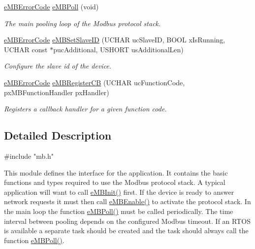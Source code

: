 \begin{DoxyCompactItemize}
\hyperlink{group__modbus_ga9e7fce8c431cb0e521c67f7f36dd823d}{e\+M\+B\+Error\+Code} \hyperlink{group__modbus_ga12648c98d45f768ba878fbcee46caca5}{e\+M\+B\+Poll} (void)
\begin{DoxyCompactList}\small\item\em The main pooling loop of the Modbus protocol stack. \end{DoxyCompactList}\item 
\hyperlink{group__modbus_ga9e7fce8c431cb0e521c67f7f36dd823d}{e\+M\+B\+Error\+Code} \hyperlink{group__modbus_gabe2b0e2dccf23d506666aa3cfdf6a8a3}{e\+M\+B\+Set\+Slave\+ID} (U\+C\+H\+AR uc\+Slave\+ID, B\+O\+OL x\+Is\+Running, U\+C\+H\+AR const $\ast$puc\+Additional, U\+S\+H\+O\+RT us\+Additional\+Len)
\begin{DoxyCompactList}\small\item\em Configure the slave id of the device. \end{DoxyCompactList}\item 
\hyperlink{group__modbus_ga9e7fce8c431cb0e521c67f7f36dd823d}{e\+M\+B\+Error\+Code} \hyperlink{group__modbus_ga5f6e66893b2388a602ac453253a00784}{e\+M\+B\+Register\+CB} (U\+C\+H\+AR uc\+Function\+Code, px\+M\+B\+Function\+Handler px\+Handler)
\begin{DoxyCompactList}\small\item\em Registers a callback handler for a given function code. \end{DoxyCompactList}\end{DoxyCompactItemize}


\subsection{Detailed Description}

\begin{DoxyCode}
\textcolor{preprocessor}{#include "mb.h"} 
\end{DoxyCode}


This module defines the interface for the application. It contains the basic functions and types required to use the Modbus protocol stack. A typical application will want to call \hyperlink{group__modbus_ga622dbe6b38ff1d255523d4736fa3da26}{e\+M\+B\+Init()} first. If the device is ready to answer network requests it must then call \hyperlink{group__modbus_gab697be370833d562e6b016626d996132}{e\+M\+B\+Enable()} to activate the protocol stack. In the main loop the function \hyperlink{group__modbus_ga12648c98d45f768ba878fbcee46caca5}{e\+M\+B\+Poll()} must be called periodically. The time interval between pooling depends on the configured Modbus timeout. If an R\+T\+OS is available a separate task should be created and the task should always call the function \hyperlink{group__modbus_ga12648c98d45f768ba878fbcee46caca5}{e\+M\+B\+Poll()}.


